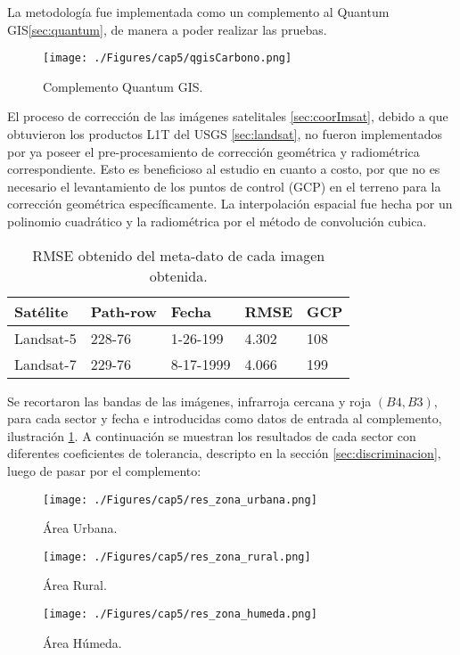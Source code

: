 La metodolog\'ia fue implementada como un complemento al Quantum GIS\ref{sec:quantum}, de manera a poder realizar las pruebas. 
\begin{figure}[H]
	\centering
	\texttt{[image: ./Figures/cap5/qgisCarbono.png]}
	\caption{Complemento Quantum GIS.}
	\label{fig:qgisC}
\end{figure}
El proceso de correcci\'on de las im\'agenes satelitales \ref{sec:coorImsat}, debido a que obtuvieron los productos L1T del USGS \ref{sec:landsat}, no fueron implementados por ya poseer el pre-procesamiento de correcci\'on geom\'etrica y radiom\'etrica correspondiente. Esto es beneficioso al estudio en cuanto a costo, por que no es necesario el levantamiento de los puntos de control (GCP) en el terreno para la correcci\'on geom\'etrica espec\'ificamente. La interpolaci\'on espacial fue hecha por un polinomio cuadr\'atico y la radiom\'etrica por el m\'etodo de convoluci\'on cubica.
\begin{table}[H]
	\centering

	\begin{tabular}{|l|l|l|l|l|}
		\hline
		\rowcolor[HTML]{EFEFEF} 
		\textbf{Sat\'elite} & \textbf{Path-row} & \textbf{Fecha} & \textbf{RMSE} & \textbf{GCP} \\ \hline
		Landsat-5         & 228-76            & 1-26-199       & 4.302         & 108          \\ \hline
		Landsat-7         & 229-76            & 8-17-1999      & 4.066         & 199          \\ \hline
	\end{tabular}
		\caption{RMSE obtenido del meta-dato de cada imagen obtenida.}
		\label{t:rmse}
\end{table}

Se recortaron las bandas de las im\'agenes, infrarroja cercana y roja $ (B4,B3) $, para cada sector y fecha e introducidas como datos de entrada al complemento, ilustraci\'on \ref{fig:qgisC}. A continuaci\'on se muestran los resultados de cada sector con diferentes coeficientes de tolerancia, descripto en la secci\'on \ref{sec:discriminacion}, luego de pasar por el complemento:
\begin{figure}[H]
	\centering
	\texttt{[image: ./Figures/cap5/res\_zona\_urbana.png]}
	\caption{\'Area Urbana.}
	\label{fig:ubana}
\end{figure}
\begin{figure}[H]
	\centering
	\texttt{[image: ./Figures/cap5/res\_zona\_rural.png]}
	\caption{\'Area Rural.}
	\label{fig:rural}
\end{figure}
\begin{figure}[H]
	\centering
	\texttt{[image: ./Figures/cap5/res\_zona\_humeda.png]}
	\caption{\'Area H\'umeda.}
	\label{fig:humeda}
\end{figure}

